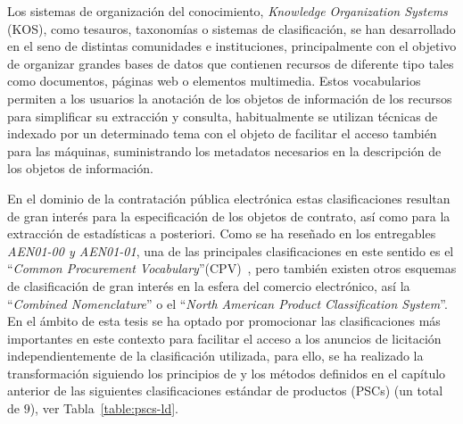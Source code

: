 Los sistemas de organización del conocimiento, \textit{Knowledge Organization Systems} (\gls{KOS}), como
tesauros, taxonomías o sistemas de clasificación, se han desarrollado en el seno de distintas comunidades e instituciones, 
principalmente con el objetivo de organizar grandes bases de datos que contienen recursos de diferente tipo tales como documentos, 
páginas web o elementos multimedia. Estos vocabularios permiten a los usuarios la anotación
de los objetos de información de los recursos para simplificar su extracción y consulta, habitualmente 
se utilizan técnicas de indexado por un determinado tema con el objeto de facilitar el acceso también para las máquinas, 
suministrando los metadatos necesarios en la descripción de los objetos de información.

En el dominio de la contratación pública electrónica estas clasificaciones resultan de gran 
interés para la especificación de los objetos de contrato, así como para la extracción de 
estadísticas a posteriori. Como se ha reseñado en los entregables \textit{AEN01-00 y AEN01-01}, una de las 
principales clasificaciones en este sentido es el ``\textit{Common Procurement Vocabulary}''(\gls{CPV})~\cite{cpvguide}, 
pero también existen otros esquemas de clasificación de gran interés en la esfera del comercio 
electrónico, así la ``\textit{Combined Nomenclature}'' o el ``\textit{North American Product Classification System}''. 
En el ámbito de esta tesis se ha optado por promocionar las clasificaciones más importantes en este contexto 
para facilitar el acceso a los anuncios de licitación independientemente de la clasificación utilizada, para ello, 
se ha realizado la transformación siguiendo los principios de \linkeddata y los métodos definidos en el capítulo anterior de 
las siguientes clasificaciones estándar de productos (\gls{PSC}s) (un total de $9$), ver Tabla~\ref{table:pscs-ld}.

